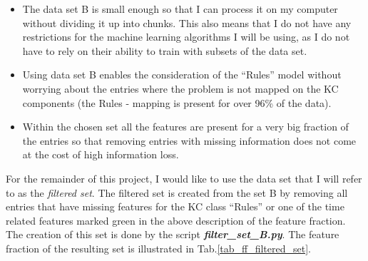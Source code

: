\begin{itemize}
	\item The data set B is small enough so that I can process it on my computer without dividing it up into chunks. This also means that I do not have any restrictions for the machine learning algorithms I will be using, as I do not have to rely on their ability to train with subsets of the data set.
	\item Using data set B enables the consideration of the “Rules” model without worrying about the entries where the problem is not mapped on the KC components (the Rules - mapping is present for over 96\% of the data).
	\item Within the chosen set all the features are present for a very big fraction of the entries so that removing entries with missing information does not come at the cost of high information loss.	
\end{itemize}

For the remainder of this project, I would like to use the data set that I will refer to as the \emph{filtered set}. The filtered set is created from the set B by removing all entries that have missing features for the KC class “Rules” or one of the time related features marked green in the above description of the feature fraction. The creation of this set is done by the script \textbf{\emph{filter\_set\_B.py}}. The feature fraction of the resulting set is illustrated in Tab.\ref{tab_ff_filtered_set}.

